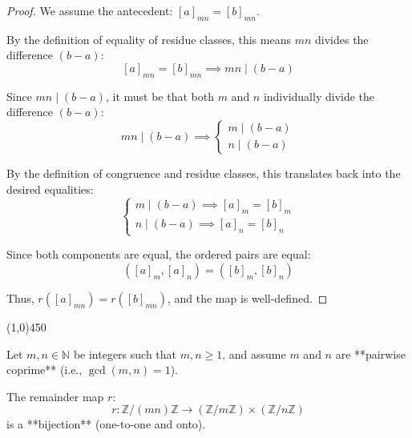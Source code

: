 \begin{proof}
    We assume the antecedent: $[a]_{mn} = [b]_{mn}$.
    
    By the definition of equality of residue classes, this means $mn$ divides the difference $(b - a)$:
    $$[a]_{mn} = [b]_{mn} \implies mn \mid (b - a)$$
    
    Since $mn \mid (b - a)$, it must be that both $m$ and $n$ individually divide the difference $(b - a)$:
    $$mn \mid (b - a) \implies \begin{cases} m \mid (b - a) \\ n \mid (b - a) \end{cases}$$
    
    By the definition of congruence and residue classes, this translates back into the desired equalities:
    $$\begin{cases} m \mid (b - a) \implies [a]_m = [b]_m \\ n \mid (b - a) \implies [a]_n = [b]_n \end{cases}$$
    
    Since both components are equal, the ordered pairs are equal:
    $$([a]_m, [a]_n) = ([b]_m, [b]_n)$$
    
    Thus, $r([a]_{mn}) = r([b]_{mn})$, and the map is well-defined.
\end{proof}

\begin{center}
    \vspace{10pt}
    \line(1,0){450}
    \vspace{25pt}
\end{center}


\begin{theorem}
    Let $m, n \in \mathbb{N}$ be integers such that $m, n \ge 1$, and assume $m$ and $n$ are **pairwise coprime** (i.e., $\gcd(m, n) = 1$).
    
    The remainder map $r$:
    $$r: \mathbb{Z}/(mn)\mathbb{Z} \longrightarrow (\mathbb{Z}/m\mathbb{Z}) \times (\mathbb{Z}/n\mathbb{Z})$$
    is a **bijection** (one-to-one and onto).
\end{theorem}

